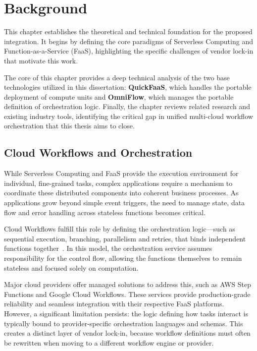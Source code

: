 \chapter{Background}
\label{cha:background}

This chapter establishes the theoretical and technical foundation for the proposed integration. It begins by defining the core paradigms of Serverless Computing and Function-as-a-Service (FaaS), highlighting the specific challenges of vendor lock-in that motivate this work.

The core of this chapter provides a deep technical analysis of the two base technologies utilized in this dissertation: \textbf{QuickFaaS}, which handles the portable deployment of compute units and \textbf{OmniFlow}, which manages the portable definition of orchestration logic. Finally, the chapter reviews related research and existing industry tools, identifying the critical gap in unified multi-cloud workflow orchestration that this thesis aims to close.

\section{Cloud Workflows and Orchestration}
\label{sec:cloud_workflows}

While Serverless Computing and FaaS provide the execution environment for individual, fine-grained tasks, complex applications require a mechanism to coordinate these distributed components into coherent business processes. As applications grow beyond simple event triggers, the need to manage state, data flow and error handling across stateless functions becomes critical.

Cloud Workflows fulfill this role by defining the orchestration logic—such as sequential execution, branching, parallelism and retries, that binds independent functions together~\cite{aws_stepfunctions_concepts,gcp_workflows_overview}. In this model, the orchestration service assumes responsibility for the control flow, allowing the functions themselves to remain stateless and focused solely on computation.

Major cloud providers offer managed solutions to address this, such as AWS Step Functions and Google Cloud Workflows. These services provide production-grade reliability and seamless integration with their respective FaaS platforms. However, a significant limitation persists: the logic defining how tasks interact is typically bound to provider-specific orchestration languages and schemas. This creates a distinct layer of vendor lock-in, because workflow definitions must often be rewritten when moving to a different workflow engine or provider.

